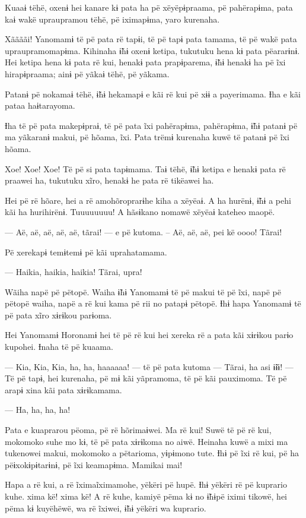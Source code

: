 Kuaaɨ tëhë, oxenɨ hei kanare kɨ pata ha pë xëyëpɨpraama, pë pahërapɨma,
pata kaɨ wakë upraupramou tëhë, pë iximapɨma, yaro kurenaha. 

Xããããi! Yanomamɨ të pë pata rë tapɨi, të pë tapɨ pata tamama, të pë wakë
pata upraupramomapɨma. Kihinaha ɨ̃hɨ oxenɨ ketipa, tukutuku hena kɨ pata
pëararɨnɨ. Hei ketipa hena kɨ pata rë kui, henakɨ pata prapɨparema, ɨ̃hɨ
henakɨ ha pë ĩxi hirapɨpraama; ainɨ pë yãkaɨ tëhë, pë yãkama. 

Patanɨ pë nokamaɨ tëhë, ɨ̃hɨ hekamapɨ e kãi rë kui pë xɨɨ a payerimama.
Ɨha e kãi pataa haɨtarayoma. 

Ɨha të pë pata makepɨpraɨ, të pë pata ĩxi pahërapɨma, pahërapɨma, ɨ̃hɨ
patanɨ pë ma yãkaranɨ makui, pë hõama, ĩxi. Pata trëmɨ kurenaha kuwë të
patanɨ pë ĩxi hõama. 

Xoe! Xoe! Xoe! Të pë si pata tapɨmama. Taɨ tëhë, ɨ̃hɨ ketipa e henakɨ
pata rë praawei ha, tukutuku xĩro, henakɨ he pata rë tikëawei ha. 

Hei pë rë hõare, hei a rë amohõroprarɨhe kiha a xëyëaɨ. A ha hurënɨ, ɨ̃hɨ
a pehi kãi ha hurihirënɨ. Tuuuuuuuu! A hãsɨkano nomawë xëyëaɨ kateheo
maopë. 

--- Aë, aë, aë, aë, aë, tãrai! --- e pë kutoma. -- Aë, aë, aë, pei kë oooo!
Tãrai!

Pë xerekapɨ temɨtemɨ pë kãi uprahatamama. 

--- Haikia, haikia, haikia! Tãrai, upra! 

Wãiha napë pë pëtopë. Waiha ɨ̃hɨ Yanomamɨ të pë makui të pë ĩxi, napë pë
pëtopë waiha, napë a rë kui kama pë rii no patapɨ pëtopë. Ɨhɨ hapa
Yanomamɨ të pë pata xĩro xɨrɨkou parɨoma. 

Hei Yanomamɨ Horonamɨ hei të pë rë kui hei xereka rë a pata kãi xɨrɨkou
parɨo kupohei. Ɨnaha të pë kuaama. 

--- Kia, Kia, Kia, ha, ha, haaaaaa! --- të pë pata kutoma --- Tãrai, ha asi
ɨ̃ɨɨ! --- Të pë tapɨ, hei kurenaha, pë mɨ kãi yãpramoma, të pë kãi
pauximoma. Të pë arapɨ xina kãi pata xɨrɨkamama. 

--- Ha, ha, ha, ha! 

Pata e kuaprarou pëoma, pë rë hõrimaɨwei. Ma rë kui! Suwë të pë rë kui,
mokomoko suhe mo kɨ, të pë pata xɨrɨkoma no aiwë. Heinaha kuwë a mixi ma
tukenowei makui, mokomoko a pëtarioma, yɨpɨmono tute. Ɨhɨ pë ĩxi rë kui,
pë ha pëɨxokɨpɨtarɨnɨ, pë ĩxi keamapɨma. Mamikai mai! 

Hapa a rë kui, a rë ĩximaĩximamohe, yëkëri pë hupë. Ɨhɨ yëkëri rë pë
kuprario kuhe. xima kë! xima kë! A rë kuhe, kamiyë pëma kɨ no ɨ̃hɨpë
iximi tikowë, hei pëma kɨ kuyëhëwë, wa rë ĩxiwei, ɨ̃hɨ yëkëri wa
kuprario. 

